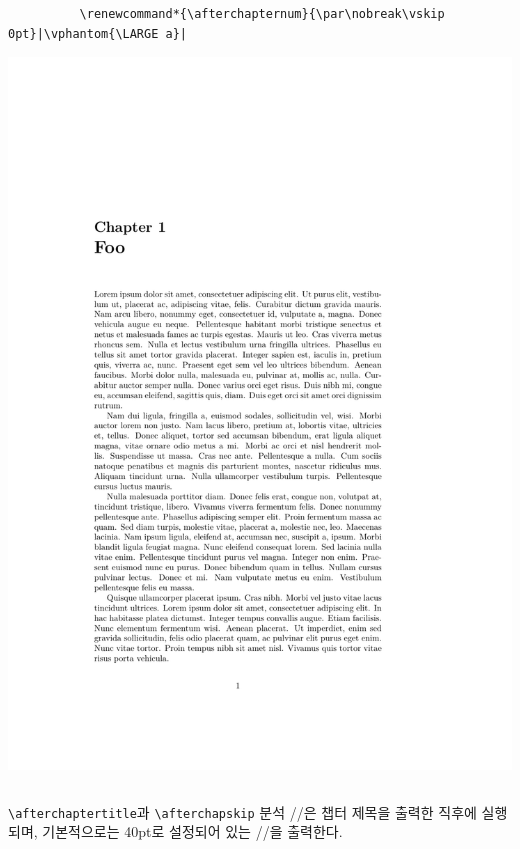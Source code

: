 \documentclass{beamer}
\def\tbs{\textbackslash}
\begin{document}
\begin{frame}[fragile]
\begin{overprint}
\begin{columns}
      \begin{column}{0.5\textwidth}
        \begin{verbatim}
          \renewcommand*{\afterchapternum}{\par\nobreak\vskip 0pt}|\vphantom{\LARGE a}|
        \end{verbatim}
        \begin{center}
          \includegraphics[frame,page=1,width=0.8\linewidth]{afterchapternum-3}
        \end{center}
      \end{column}
    \end{columns}
  \end{overprint}
\end{frame}

\begin{frame}[fragile]
  {\texttt{\tbs afterchaptertitle}과 \texttt{\tbs afterchapskip} 분석}
  \ltxverb/\afterchaptertitle/은 챕터 제목을 출력한 직후에 실행되며,
  기본적으로는 40pt로 설정되어 있는 \ltxverb/\afterchapskip/을 출력한다.
\end{frame}
\end{document}
